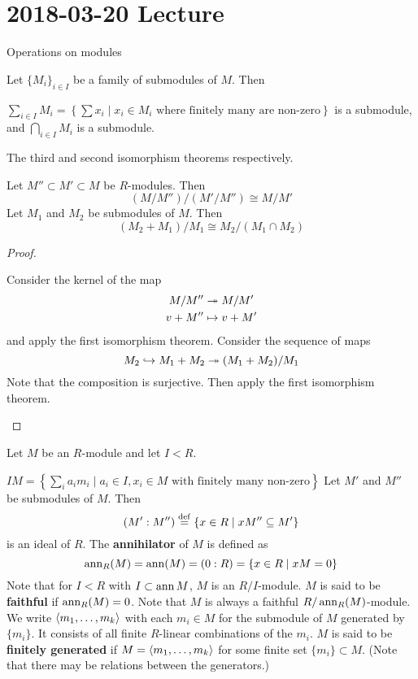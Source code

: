 \section{2018-03-20 Lecture}

Operations on modules

\begin{defn}
	Let $\{M_i\}_{i \in I}$ be a family of submodules of $M$.
	Then
	\begin{enum}
		\io $\displaystyle \sum_{i \in I} M_i = \left\{\sum x_i \mid x_i \in M_i \text{ where finitely many are non-zero}\right\}$ is a submodule, and
		\io $\displaystyle \bigcap_{i \in I} M_i$ is a submodule.
	\end{enum}
\end{defn}

\begin{prop}[1.5]
	The third and second isomorphism theorems respectively.
	\begin{enum}
		\io Let $M'' \subset M' \subset M$ be $R$-modules.
		Then
		\[(M/M'')/(M'/M'') \cong M/M'\]
		\io Let $M_1$ and $M_2$ be submodules of $M$.
		Then
		\[(M_2+M_1)/M_1 \cong M_2/(M_1 \cap M_2)\]
	\end{enum}
\end{prop}

\begin{proof}
  	\leavevmode
	\begin{enum}
		\io Consider the kernel of the map
		\begin{align*}
			M/M'' &\twoheadrightarrow M/M' \\
			v + M'' &\mapsto v + M'
		\end{align*}
		and apply the first isomorphism theorem.
		\io Consider the sequence of maps
		\[M_2 \hookrightarrow M_1+M_2 \twoheadrightarrow (M_1+M_2)/M_1\]
		Note that the composition is surjective.
		Then apply the first isomorphism theorem.
	\end{enum}
\end{proof}

\begin{defn}[1.6]
	Let $M$ be an $R$-module and let $I<R$.
	\begin{enum}
		\io $\displaystyle IM = \left\{\sum_i a_im_i \mid a_i \in I, x_i \in M \text{ with finitely many non-zero} \right\}$
		\io Let $M'$ and $M''$ be submodules of $M$.
		Then
		\[(M':M'') \overset{\mathrm{def}}{=} \{x \in R \mid xM'' \subseteq M'\}\]
		is an ideal of $R$.
		\io The \textbf{annihilator} of $M$ is defined as
		\[\operatorname{ann}_R(M) = \operatorname{ann}(M) = (0:R) = \{x \in R \mid xM = 0\}\]
		Note that for $I<R$ with $I \subset \operatorname{ann} M$, $M$ is an $R/I$-module.
		\io $M$ is said to be \textbf{faithful} if $\operatorname{ann}_R(M) = 0$.
		Note that $M$ is always a faithful $R/\operatorname{ann}_R(M)$-module.
		\io We write ${\left\langle m_1,\ldots,m_k \right\rangle}$ with each $m_i \in M$ for the submodule of $M$ generated by $\{m_i\}$.
		It consists of all finite $R$-linear combinations of the $m_i$.
		\io $M$ is said to be \textbf{finitely generated} if $M={\left\langle m_1,\ldots,m_k \right\rangle}$ for some finite set $\{m_i\} \subset M$.
		(Note that there may be relations between the generators.)
	\end{enum}
\end{defn}

